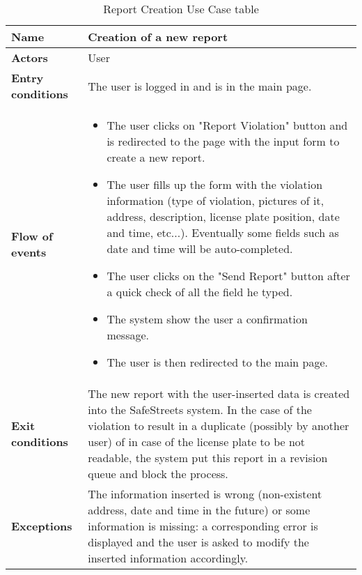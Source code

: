 \begin{table}[!htbp]
	\centering
	\begin{tabular}{lp{9cm}}
\bf\large Name&\bf\large Creation of a new report\\
\hline
\hline
\bf Actors&User\\
\hline
\bf Entry conditions&The user is logged in and is in the main page.\\
\hline
\bf Flow of events&
\begin{itemize}

\item The user clicks on "Report Violation" button and is redirected to the page with the input form to create a new report.

\item The user fills up the form with the violation information (type of violation, pictures of it, address, description, license plate position, date and time, etc...). Eventually some fields such as date and time will be auto-completed.

\item The user clicks on the "Send Report" button after a quick check of all the field he typed.

\item The system show the user a confirmation message. 

\item The user is then redirected to the main page.

\end{itemize}
\\
\hline
\bf Exit conditions&The new report with the user-inserted data is created into the SafeStreets system. In the case of the violation to result in a duplicate (possibly by another user) of in case of the license plate to be not readable, the system put this report in a revision queue and block the process.\\
\hline
\bf Exceptions&The information inserted is wrong (non-existent address, date and time in the future) or some information is missing: a corresponding error is displayed and the user is asked to modify the inserted information accordingly.
\\
\hline

\end{tabular}
\caption{Report Creation Use Case table}
 \label{tab:reportcreationtab}
\end{table}